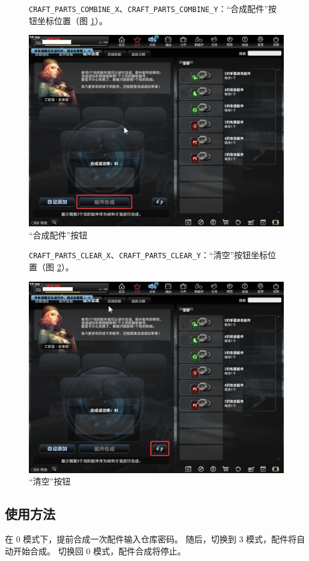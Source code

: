 \begin{figure}[H]
    \Centering
    \parbox[l]{\textwidth}{\lstinline{CRAFT_PARTS_COMBINE_X}、\lstinline{CRAFT_PARTS_COMBINE_Y}：“合成配件”按钮坐标位置（图 \ref{ch3fig-combine}）。}
    \includegraphics[width=\textwidth]{docs/assets/combine.png}
    \caption{“合成配件”按钮}
    \label{ch3fig-combine}
\end{figure}

\begin{figure}[H]
    \Centering
    \parbox[l]{\textwidth}{\lstinline{CRAFT_PARTS_CLEAR_X}、\lstinline{CRAFT_PARTS_CLEAR_Y}：“清空”按钮坐标位置（图 \ref{ch3fig-clear}）。}
    \includegraphics[width=\textwidth]{docs/assets/clear.png}
    \caption{“清空”按钮}
    \label{ch3fig-clear}
\end{figure}

\subsection{使用方法}

在 0 模式下，提前合成一次配件输入仓库密码。
随后，切换到 3 模式，配件将自动开始合成。
切换回 0 模式，配件合成将停止。